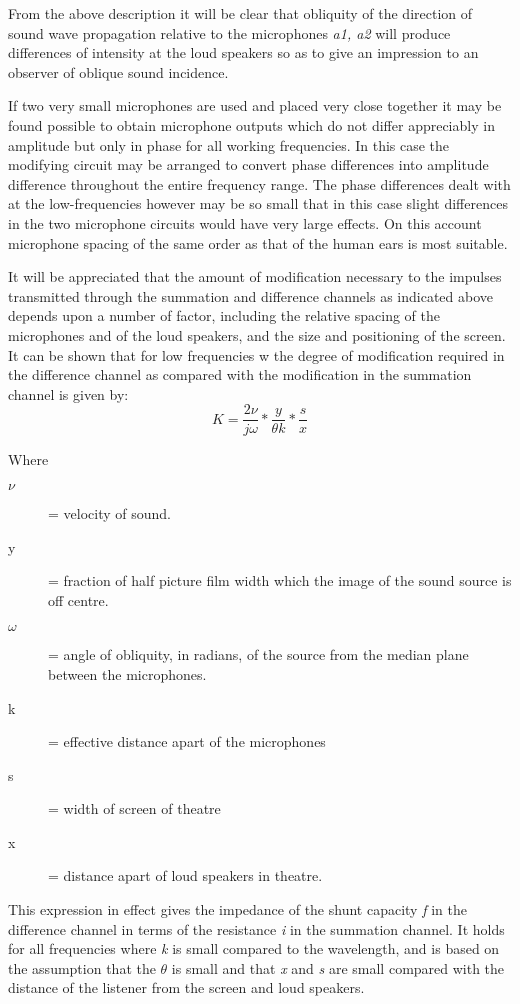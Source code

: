 \documentclass[11pt]{article}
\begin{document}
\begin{multicols*}{2}
From the above description it will be clear that obliquity of the direction of sound wave propagation relative to the microphones \textit{a1, a2} will produce differences of intensity at the loud speakers so as to give an impression to an observer of oblique sound incidence.

If two very small microphones are used and placed very close together it may be found possible to obtain microphone outputs which do not differ appreciably in amplitude but only in phase for all working frequencies. In this case the modifying circuit may be arranged to convert phase differences into amplitude difference throughout the entire frequency range. The phase differences dealt with at the low-frequencies however may be so small that in this case slight differences in the two microphone circuits would have very large effects. On this account microphone spacing of the same order as that of the human ears is most suitable.

It will be appreciated that the amount of modification necessary to the impulses transmitted through the summation and difference channels as indicated above depends upon a number of factor, including the relative spacing of the microphones and of the loud speakers, and the size and positioning of the screen. It can be shown that for low frequencies w the degree of modification required in the difference channel as compared with the modification in the summation channel is given by:
\[
K = \frac{2\nu}{j\omega} * \frac{y}{\theta k} * \frac{s}{x}
\]

Where
\begin{description}
	\item [$\nu$] = velocity of sound.
	\item[y] = fraction of half picture film width which the image of the sound source is off centre.
	\item[$\omega$] = angle of obliquity, in radians, of the source from the median plane between the microphones.
	\item[k] = effective distance apart of the microphones
	\item[s] = width of screen of theatre
	\item[x] = distance apart of loud speakers in theatre.
\end{description}

This expression in effect gives the impedance of the shunt capacity \textit{f} in the difference channel in terms of the resistance \textit{i} in the summation channel. It holds for all frequencies where \textit{k} is small compared to the wavelength, and is based on the assumption that the $\theta$ is small and that \textit{x} and \textit{s} are small compared with the distance of the listener from the screen and loud speakers.


\end{multicols*}
\end{document}
